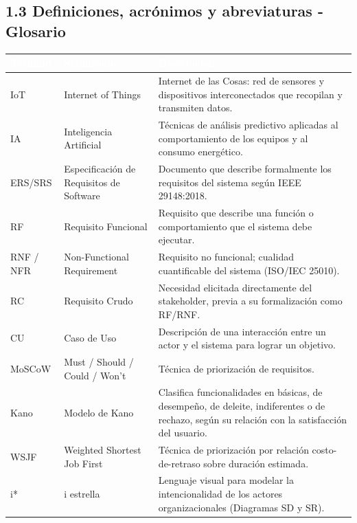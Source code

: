 \subsection*{1.3 Definiciones, acrónimos y abreviaturas - Glosario}


\begingroup
\small
\begin{longtable}{|p{5.2cm}|p{5.2cm}|p{5.2cm}|}
\hline
\cellcolor{sigagreen}\textcolor{white}{\textbf{Término}} & \cellcolor{sigagreen}\textcolor{white}{\textbf{Significado}} & \cellcolor{sigagreen}\textcolor{white}{\textbf{Descripción}} \\ \hline
IoT & Internet of Things & Internet de las Cosas: red de sensores y dispositivos interconectados que recopilan y transmiten datos. \\ \hline
IA & Inteligencia Artificial & Técnicas de análisis predictivo aplicadas al comportamiento de los equipos y al consumo energético. \\ \hline
ERS/SRS & Especificación de Requisitos de Software & Documento que describe formalmente los requisitos del sistema según IEEE 29148:2018. \\ \hline
RF & Requisito Funcional & Requisito que describe una función o comportamiento que el sistema debe ejecutar. \\ \hline
RNF / NFR & Non-Functional Requirement & Requisito no funcional; cualidad cuantificable del sistema (ISO/IEC 25010). \\ \hline
RC & Requisito Crudo & Necesidad elicitada directamente del stakeholder, previa a su formalización como RF/RNF. \\ \hline
CU & Caso de Uso & Descripción de una interacción entre un actor y el sistema para lograr un objetivo. \\ \hline
MoSCoW & Must / Should / Could / Won't & Técnica de priorización de requisitos. \\ \hline
Kano & Modelo de Kano & Clasifica funcionalidades en básicas, de desempeño, de deleite, indiferentes o de rechazo, según su relación con la satisfacción del usuario. \\ \hline
WSJF & Weighted Shortest Job First & Técnica de priorización por relación costo-de-retraso sobre duración estimada. \\ \hline
i* & i estrella & Lenguaje visual para modelar la intencionalidad de los actores organizacionales (Diagramas SD y SR). \\ \hline

\end{longtable}
